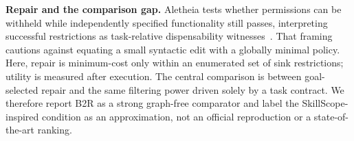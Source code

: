 \textbf{Repair and the comparison gap.} Aletheia tests whether permissions can be withheld while independently specified functionality still passes, interpreting successful restrictions as task-relative dispensability witnesses~\cite{aletheia2026}. That framing cautions against equating a small syntactic edit with a globally minimal policy. Here, repair is minimum-cost only within an enumerated set of sink restrictions; utility is measured after execution. The central comparison is between goal-selected repair and the same filtering power driven solely by a task contract. We therefore report B2R as a strong graph-free comparator and label the SkillScope-inspired condition as an approximation, not an official reproduction or a state-of-the-art ranking.
